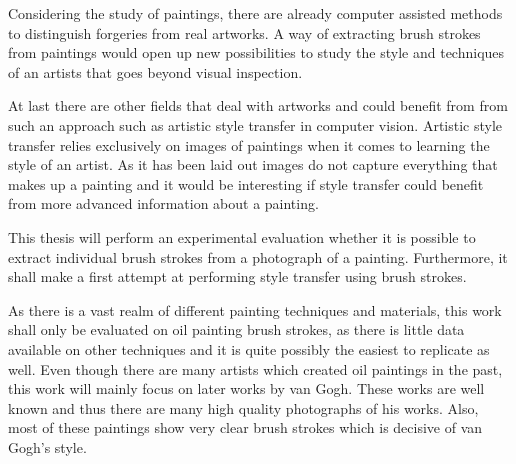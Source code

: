 Considering the study of paintings, there are already computer assisted methods to distinguish forgeries from real artworks.
A way of extracting brush strokes from paintings would open up new possibilities to study the style and techniques of an artists that goes beyond visual inspection.

At last there are other fields that deal with artworks and could benefit from from such an approach such as artistic style transfer in computer vision.
Artistic style transfer relies exclusively on images of paintings when it comes to learning the style of an artist.
As it has been laid out images do not capture everything that makes up a painting and it would be interesting if style transfer could benefit from more advanced information about a painting.

This thesis will perform an experimental evaluation whether it is possible to extract individual brush strokes from a photograph of a painting.
Furthermore, it shall make a first attempt at performing style transfer using brush strokes.

As there is a vast realm of different painting techniques and materials, this work shall only be evaluated on oil painting brush strokes, as there is little data available on other techniques and it is quite possibly the easiest to replicate as well.
Even though there are many artists which created oil paintings in the past, this work will mainly focus on later works by van Gogh.
These works are well known and thus there are many high quality photographs of his works.
Also, most of these paintings show very clear brush strokes which is decisive of van Gogh's style.



